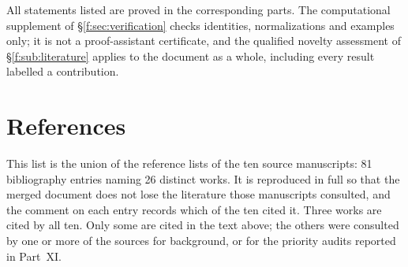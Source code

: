 \documentclass[11pt,a4paper]{article}
\numberwithin{equation}{section}
\theoremstyle{definition}
\theoremstyle{remark}
\theoremstyle{plain}
\begin{document}
All statements listed are proved in the corresponding parts. The
computational supplement of \S\ref{f:sec:verification} checks identities,
normalizations and examples only; it is not a proof-assistant certificate,
and the qualified novelty assessment of \S\ref{f:sub:literature} applies to
the document as a whole, including every result labelled a contribution.
\clearpage
\section*{References}

This list is the union of the reference lists of the ten source
manuscripts: 81 bibliography entries naming 26 distinct works.  It is
reproduced in full so that the merged document does not lose the
literature those manuscripts consulted, and the comment on each entry
records which of the ten cited it.  Three works are cited by all ten.
Only some are cited in the text above; the others were consulted by one or
more of the sources for background, or for the priority audits reported in
Part~XI.
\end{document}
